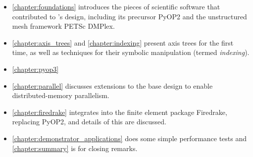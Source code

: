 \documentclass[thesis]{subfiles}
\begin{document}

\begin{itemize}
  \item
    \cref{chapter:foundations} introduces the pieces of scientific software that contributed to 's design, including its precursor PyOP2 and the unstructured mesh framework PETSc DMPlex.
  \item
    \cref{chapter:axis_trees} and \cref{chapter:indexing} present axis trees for the first time, as well as techniques for their symbolic manipulation (termed \textit{indexing}).
  \item
    \cref{chapter:pyop3} 
  \item
    \cref{chapter:parallel} discusses extensions to the base design to enable distributed-memory parallelism.
  \item
    \cref{chapter:firedrake} integrates  into the finite element package Firedrake, replacing PyOP2, and details of this are discussed.
  \item
    \cref{chapter:demonstrator_applications} does some simple performance tests and \cref{chapter:summary} is for closing remarks.
\end{itemize}




\end{document}
